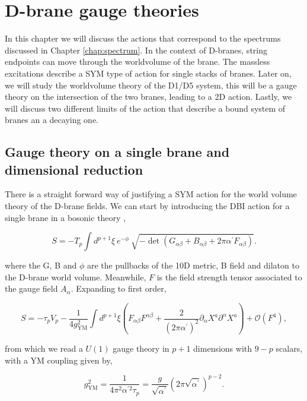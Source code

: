 \chapter{D-brane gauge theories}
\label{chap:gauge}
\pagestyle{fancy}

In this chapter we will discuss the actions that correspond to the spectrums discussed in Chapter \ref{chap:spectrum}. In the context of D-branes, string endpoints can move through the worldvolume of the brane. The massless excitations describe a SYM type of action for single stacks of branes. Later on, we will study the worldvolume theory of the D1/D5 system, this will be a gauge theory on the intersection of the two branes, leading to a 2D action. Lastly, we will discuss two different limits of the action that describe a bound system of branes an a decaying one.

\section{Gauge theory on a single brane and dimensional reduction}

There is a straight forward way of justifying a SYM action for the world volume theory of the D-brane fields. We can start by introducing the DBI action for a single brane in a bosonic theory \cite{taylor1998lectures},

\begin{equation}
    S=-T_p\int d^{p+1}\xi\mathrm{~}e^{-\phi}\mathrm{~}\sqrt{-\det(G_{\alpha\beta}+B_{\alpha\beta}+2\pi\alpha^{\prime}F_{\alpha\beta})}.
\end{equation}

where the G, B and $\phi$ are the pullbacks of the 10D metric, B field and dilaton to the D-brane world volume. Meanwhile, $F$ is the field strength tensor associated to the gauge field $A_\alpha$. Expanding to first order,

\begin{equation}
    S=-\tau_pV_p-\frac1{4g_{\mathrm{YM}}^2}\int d^{p+1}\xi\left(F_{\alpha\beta}F^{\alpha\beta}+\frac2{(2\pi\alpha^{\prime})^2}\partial_\alpha X^a\partial^\alpha X^a\right)+\mathcal{O}(F^4),
\end{equation}

from which we read a $U(1)$ gauge theory in $p+1$ dimensions with $9-p$ scalars, with a YM coupling given by,

\begin{equation}
    g_{\mathrm{YM}}^2=\frac1{4\pi^2\alpha^{\prime2}\tau_p}=\frac g{\sqrt{\alpha^{\prime}}}(2\pi\sqrt{\alpha^{\prime}})^{p-2}.
\end{equation}

